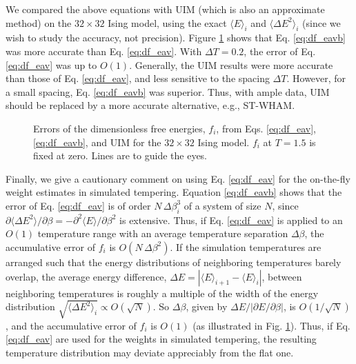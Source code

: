 \documentclass[reprint,aip,jcp,superscriptaddress]{revtex4-1}
\begin{document}
We compared the above equations
with UIM\cite{kastner2005}
(which is also an approximate method)
on the $32\times 32$ Ising model,
%
using the exact
$\langle E \rangle_i$
and
$\langle \Delta E^2 \rangle_i$\cite{
ferdinand1969}
(since we wish to study
the accuracy, not precision).
%
Figure \ref{fig:is2approx}
shows that
Eq. \eqref{eq:df_eavb}
was more accurate than
Eq. \eqref{eq:df_eav}.
%
With $\Delta T = 0.2$,
the error of Eq. \eqref{eq:df_eav}
was up to $O(1)$.
%
Generally, the UIM results were more accurate
than those of Eq. \eqref{eq:df_eav},
and less sensitive to the spacing $\Delta T$.
%
However, for a small spacing,
Eq. \eqref{eq:df_eavb} was superior.
%
Thus, with ample data,
UIM should be replaced
by a more accurate alternative, e.g., ST-WHAM.




\begin{figure}[h]
  \caption{
    \label{fig:is2approx}
    Errors of the dimensionless free energies, $f_i$,
    from Eqs. \eqref{eq:df_eav}, \eqref{eq:df_eavb},
    and UIM for the $32\times 32$ Ising model.
    $f_i$ at $T = 1.5$ is fixed at zero.
    Lines are to guide the eyes.
  }
\end{figure}



Finally, we give a cautionary comment
on using Eq. \eqref{eq:df_eav}
for the on-the-fly weight estimates
in simulated tempering\cite{park2007}.
%
Equation \eqref{eq:df_eavb} shows that
the error of Eq. \eqref{eq:df_eav}
is of order $N \, \Delta \beta_i^3$
of a system of size $N$,
since
$\partial \langle \Delta E^2 \rangle / \partial \beta
= -\partial^2 \langle E \rangle / \partial \beta^2$
is extensive.
%
Thus,
if Eq. \eqref{eq:df_eav} is applied to
an $O(1)$ temperature range
with an average temperature separation $\Delta \beta$,
the accumulative error of $f_i$
is $O(N \, \Delta \beta^2)$.
%
If the simulation temperatures
are arranged
such that the energy distributions
of neighboring temperatures
barely overlap,
%
the average energy difference,
$\Delta E = \left| \langle E \rangle_{i+1} - \langle E \rangle_i \right|$,
between neighboring temperatures
is roughly a multiple of the width of
the energy distribution
$\sqrt{ \langle \Delta E^2 \rangle_i } \propto O(\sqrt{N})$.
%
So $\Delta \beta$,
given by $\Delta E / |\partial E/\partial \beta|$,
is $O(1/\sqrt{N})$,
%
and the accumulative error
of $f_i$ is $O(1)$
(as illustrated in Fig. \ref{fig:is2approx}).
%
Thus, if Eq. \eqref{eq:df_eav}
are used for the weights
in simulated tempering\cite{park2007},
the resulting temperature distribution
may deviate appreciably
from the flat one.
%




\end{document}
